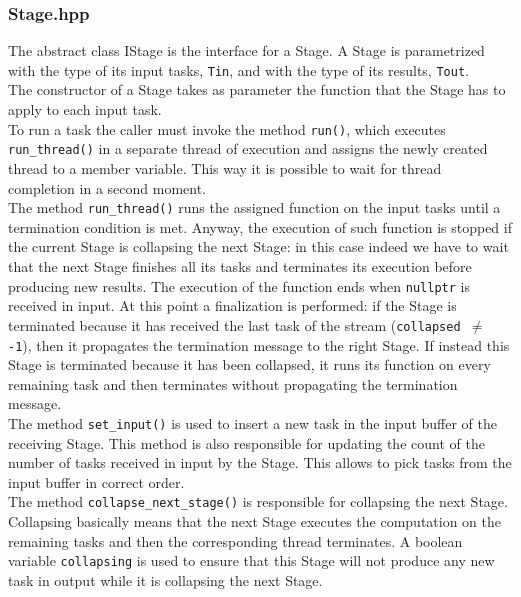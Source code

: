 \documentclass[12pt]{article}
\begin{document}
\subsubsection{Stage.hpp}
The abstract class IStage is the interface for a Stage.
A Stage is parametrized with the type of its input tasks, \texttt{Tin}, and with the type of its results, \texttt{Tout}. \\
The constructor of a Stage takes as parameter the function that the Stage has to apply to each input task. \\
To run a task the caller must invoke the method \texttt{run()}, which executes \texttt{run\_thread()} in a separate thread of execution and assigns the newly created thread to a member variable. This way it is possible to wait for thread completion in a second moment. \\
The method \texttt{run\_thread()} runs the assigned function on the input tasks until a termination condition is met. Anyway, the execution of such function is stopped if the current Stage is collapsing the next Stage: in this case indeed we have to wait that the next Stage finishes all its tasks and terminates its execution before producing new results. The execution of the function ends when \texttt{nullptr} is received in input. At this point a finalization is performed: if the Stage is terminated because it has received the last task of the stream (\texttt{collapsed $\neq$ -1}), then it propagates the termination message to the right Stage. If instead this Stage is terminated because it has been collapsed, it runs its function on every remaining task and then terminates without propagating the termination message. \\
The method \texttt{set\_input()} is used to insert a new task in the input buffer of the receiving Stage. This method is also responsible for updating the count of the number of tasks received in input by the Stage. This allows to pick tasks from the input buffer in correct order. \\
The method \texttt{collapse\_next\_stage()} is responsible for collapsing the next Stage. Collapsing basically means that the next Stage executes the computation on the remaining tasks and then the corresponding thread terminates. A boolean variable \texttt{collapsing} is used to ensure that this Stage will not produce any new task in output while it is collapsing the next Stage.
\end{document}
